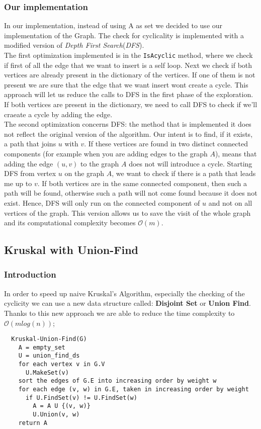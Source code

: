 \subsubsection{Our implementation}
In our implementation, instead of using A as set we decided to use our implementation of the Graph.
The check for cyclicality is implemented with a modified version of \textit{Depth First Search}(\textit{DFS}).\\
The first optimization implemented is in the \verb|IsAcyclic| method, where we check if first of all the edge that we want 
to insert is a self loop. Next we check if both vertices are already present in the dictionary of the vertices.
If one of them is not present we are sure that the edge that we want insert wont create a cycle.
This approach will let us reduce the calls to DFS in the first phase of the exploration.
If both vertices are present in the dictionary, we need to call DFS to check if we'll craeate a cycle by adding the edge.\\
The second optimization concerns DFS: the method that is implemented it does not reflect the original version 
of the algorithm. Our intent is to find, if it exists, a path that joins $u$ with $v$. If these vertices are found 
in two distinct connected components (for example when you are adding edges to the graph $A$), means that adding the 
edge $(u, v)$ to the graph $A$ does not will introduce a cycle. Starting DFS from vertex $u$ on the graph $A$,
we want to check if there is a path that leads me up to $v$.
If both vertices are in the same connected component, then such a path will be found, otherwise such a path will 
not come found because it does not exist. Hence, DFS will only run on the connected component of $u$ and not on all 
vertices of the graph. This version allows us to save the visit of the whole graph and its computational complexity 
becomes $\mathcal{O}(m)$.

\subsection{Kruskal with Union-Find}
\subsubsection{Introduction}
In order to speed up naive Kruskal's Algorithm, especially the checking of the cyclicity we can use a new 
data structure called: \textbf{Disjoint Set} or \textbf{Union Find}.\\
Thanks to this new approach we are able to reduce the time complexity to $\mathcal{O}(mlog(n))$;
\begin{verbatim}
  Kruskal-Union-Find(G)
    A = empty_set
    U = union_find_ds
    for each vertex v in G.V
      U.MakeSet(v)
    sort the edges of G.E into increasing order by weight w
    for each edge (v, w) in G.E, taken in increasing order by weight
      if U.FindSet(v) != U.FindSet(w)
        A = A U {(v, w)}
        U.Union(v, w)
    return A
\end{verbatim}

